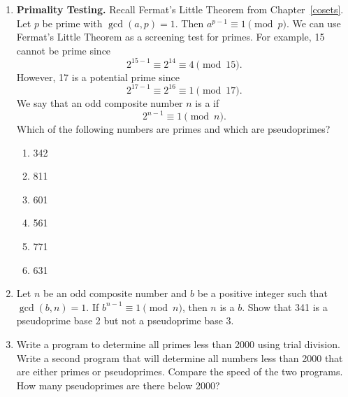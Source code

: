 {\begin{enumerate}
\begin{enumerate}
{}
 
\medskip
 
The expression  $\lceil \sqrt{n}\, \rceil$ means the smallest integer
greater than or equal to the square root of $n$. Write another program
to do factorization using trial division and compare the speed of the
two algorithms. Which algorithm is faster and why?

\end{enumerate}
 
 
\item
\textbf{Primality Testing.}
Recall Fermat's Little Theorem from Chapter~\ref{cosets}. Let $p$ be prime with
$\gcd(a, p) = 1$. Then $a^{p-1} \equiv 1 \pmod{p}$.  We can use
Fermat's Little Theorem as a screening test for primes. For example, 15
cannot be prime since
\[
2^{15-1} \equiv 2^{14} \equiv 4 \pmod{15}.
\]
However, 17 is a potential prime since
\[
2^{17-1} \equiv 2^{16} \equiv 1 \pmod{17}.
\]
We say that an odd composite number $n$ is a  if 
\[
2^{n-1} \equiv 1 \pmod{n}.
\]
Which of the following numbers are primes  and which are pseudoprimes?
\begin{multicols}{3}
\begin{enumerate}

\item
342

\item
811

\item
601

\item
561

\item
771

\item
631
 
\end{enumerate}
\end{multicols}
 
 

\item
Let $n$ be an odd composite number and $b$ be a positive integer such
that $\gcd(b, n) = 1$. If $b^{n-1} \equiv 1 \pmod{n}$, then $n$ is a
 $b$. Show that 341 is a pseudoprime base 2 but
not a pseudoprime base 3.
 
 
\item
Write a program to determine all primes less than 2000 using
trial division. Write a second program that will determine all numbers
less than 2000 that are either primes or pseudoprimes. Compare the
speed of the two programs.  How many pseudoprimes are there below
2000? 
 

\end{enumerate}}
